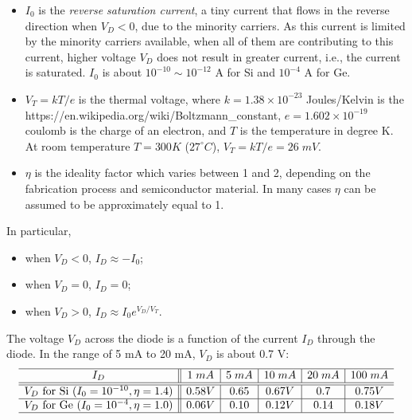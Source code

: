 \documentclass{article}
\begin{document}
\begin{itemize}
\item $I_0$ is the {\em reverse saturation current}, a tiny current that 
  flows in the reverse direction when $V_D < 0$, due to the minority 
  carriers. As this current is limited by the minority carriers available,
  when all of them are contributing to this current, higher voltage $V_D$
  does not result in greater current, i.e., the current is saturated. 
  $I_0$ is about $10^{-10} \sim 10^{-12}$ A for Si and $10^{-4}$ A for Ge.
\item $ V_T=kT/e $ is the thermal voltage, where 
  $k=1.38\times 10^{-23}$ Joules/Kelvin is the
                  {https://en.wikipedia.org/wiki/Boltzmann_constant},
  $e=1.602\times 10^{-19}$ coulomb is the charge of an electron, and
  $T$ is the temperature in degree K. At room temperature $T=300 K$
  ($27^\circ C$), $V_T=kT/e=26\; mV$.
\item $\eta$ is the ideality factor which varies between 1 and 2, depending
  on the fabrication process and semiconductor material. In many cases $\eta$
  can be assumed to be approximately equal to 1.
\end{itemize}
In particular, 
\begin{itemize}
\item when $V_D<0$, $I_D\approx -I_0$; 
\item when $V_D=0$, $I_D=0$; 
\item when $V_D>0$, $I_D\approx I_0 e^{V_D/V_T}$.
\end{itemize}


The voltage $V_D$ across the diode is a function of the current $I_D$ through 
the diode. In the range of 5 mA to 20 mA, $V_D$ is about 0.7 V:
\begin{equation}
\begin{array}{c||c|c|c|c|c} \hline
I_D	& 1 \;mA & 5 \;mA & 10 \;mA & 20 \; mA & 100 \;mA	\\ \hline\hline
V_D \mbox{ for Si } (I_0=10^{-10}, \eta=1.4) & 0.58 V & 0.65 & 0.67 V & 0.7 & 0.75 V \\\hline
V_D \mbox{ for Ge } (I_0=10^{-4}, \eta=1.0) & 0.06 V & 0.10 & 0.12 V & 0.14 & 0.18 V \\\hline
\end{array}
\end{equation}
\end{document}
